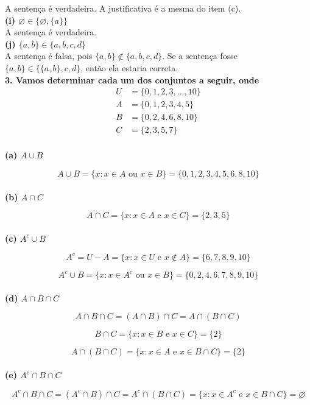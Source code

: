 \documentclass[12pt, a4paper]{article}
\begin{document}
A sentença é verdadeira. A justificativa é a mesma do item (c). \\

\textbf{(i) \(\varnothing \in \{\varnothing, \{a\}\}\)} \\

A sentença é verdadeira. \\

\textbf{(j) \(\{a,b\} \in \{a,b,c,d\}\)} \\

A sentença é falsa, pois \(\{a,b\} \notin \{a,b,c,d\}\). Se a sentença fosse \(\{a,b\} \in \{\{a,b\},c,d\}\), então ela estaria correta. \\


\textbf{3. Vamos determinar cada um dos conjuntos a seguir, onde} 
\begin{align*}
U &= \{0,1,2,3,\ldots, 10\}  \\
A &= \{0,1,2,3,4,5\} \\
B &= \{0,2,4,6,8,10\} \\
C &= \{2,3,5,7\} \\
\end{align*}

\textbf{(a) \(A \cup B\)} 

\[A \cup B = \{x: x \in A \text{ ou } x \in B\} = \{0,1,2,3,4,5,6,8,10\}\]  \\

\textbf{(b) \(A \cap C\)} 

\[A \cap C = \{x: x \in A \text{ e } x \in C\} = \{2,3,5\}\] \\

\textbf{(c) \(A^c \cup B\)} 

\[A^c = U - A = \{x:x \in U \text{ e } x \notin A\} = \{6,7,8,9,10\}\] 

\[A^c \cup B = \{x: x \in A^c \text{ ou } x \in B\} = \{0, 2,4,6,7,8,9,10\}\] \\

\textbf{(d) \(A \cap B \cap C\)} 

\[A \cap B \cap C = (A \cap B) \cap C = A \cap (B \cap C)\] 

\[B \cap C = \{x: x \in B \text{ e } x \in C\} = \{2\}\] 

\[A \cap (B \cap C) = \{x: x \in A \text{ e } x \in B \cap C\} = \{2\}\] \\

\textbf{(e) \(A^c \cap B \cap C\)} 

\[A^c \cap B \cap C = (A^c \cap B) \cap C = A^c \cap (B \cap C) = \{x: x \in A^c \text{ e } x \in B \cap C\} = \varnothing\] \\
\end{document}
